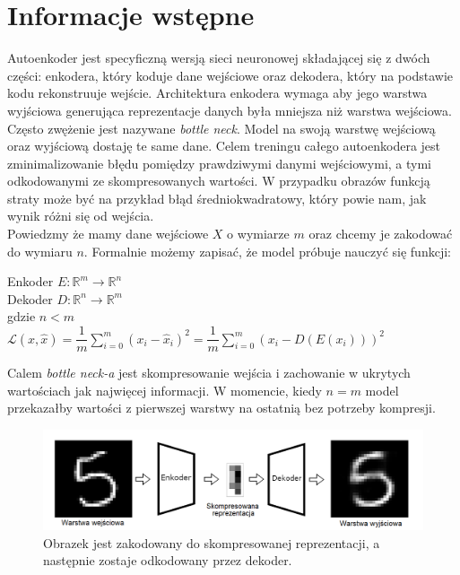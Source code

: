 \documentclass[a4paper,12pt]{book} %
\begin{document}
\section{Informacje wstępne}
Autoenkoder jest specyficzną wersją sieci neuronowej składającej się z dwóch części: enkodera, który koduje dane wejściowe oraz dekodera, który na podstawie kodu rekonstruuje wejście.\cite{bank2021autoencoders} Architektura enkodera wymaga aby jego warstwa wyjściowa generująca reprezentacje danych była mniejsza niż warstwa wejściowa. Często zwężenie jest nazywane \textit{bottle neck}. Model na swoją warstwę wejściową oraz wyjściową dostaję te same dane. Celem treningu całego autoenkodera jest zminimalizowanie błędu pomiędzy prawdziwymi danymi wejściowymi, a tymi odkodowanymi ze skompresowanych wartości. W przypadku obrazów funkcją straty może być na przykład błąd średniokwadratowy, który powie nam, jak wynik różni się od wejścia. \\
Powiedzmy że mamy dane wejściowe $X$ o wymiarze $m$ oraz chcemy je zakodować do wymiaru $n$. Formalnie możemy zapisać, że model próbuje nauczyć się funkcji:\\
\begin{center}
	Enkoder $E : \mathbb{R}^m \rightarrow \mathbb{R}^n$\\
	Dekoder $D: \mathbb{R}^n \rightarrow \mathbb{R}^m$ \\
	gdzie $n < m$\\
	$\mathcal{L}(x, \hat{x}) = \dfrac{1}{m}\displaystyle\sum_{i=0}^{m}(x_i-\hat{x}_i)^2 = \dfrac{1}{m}\displaystyle\sum_{i=0}^{m}(x_i-D(E(x_i)))^2$
\end{center}
Calem \textit{bottle neck-a} jest skompresowanie wejścia i zachowanie w ukrytych wartościach jak najwięcej informacji. W momencie, kiedy $n = m$ model przekazałby wartości z pierwszej warstwy na ostatnią bez potrzeby kompresji.

\begin{figure}[h]
	\centering\includegraphics[width=14.5cm]{pictures/autoencoder.png}
	\caption{Obrazek jest zakodowany do skompresowanej reprezentacji, a następnie zostaje odkodowany przez dekoder.}
\end{figure}
\newpage
\end{document}
